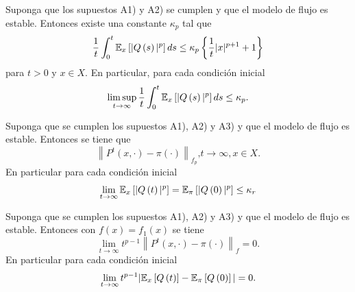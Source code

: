 \begin{Teo}\label{Tma.5.5.DaiSean}
Suponga que los supuestos A1) y A2) se cumplen y que el modelo de
flujo es estable. Entonces existe una constante $\kappa_{p}$ tal
que
\begin{equation}
\frac{1}{t}\int_{0}^{t}\mathbb{E}_{x}\left[|Q\left(s\right)|^{p}\right]ds\leq\kappa_{p}\left\{\frac{1}{t}|x|^{p+1}+1\right\}
\end{equation}
para $t>0$ y $x\in X$. En particular, para cada condici\'on
inicial
\begin{eqnarray*}
\limsup_{t\rightarrow\infty}\frac{1}{t}\int_{0}^{t}\mathbb{E}_{x}\left[|Q\left(s\right)|^{p}\right]ds\leq\kappa_{p}.
\end{eqnarray*}
\end{Teo}

\begin{Teo}\label{Tma.6.2.DaiSean}
Suponga que se cumplen los supuestos A1), A2) y A3) y que el
modelo de flujo es estable. Entonces se tiene que
\begin{equation}
\left\|P^{t}\left(x,\cdot\right)-\pi\left(\cdot\right)\right\|_{f_{p}}\textrm{,
}t\rightarrow\infty,x\in X.
\end{equation}
En particular para cada condici\'on inicial
\begin{eqnarray*}
\lim_{t\rightarrow\infty}\mathbb{E}_{x}\left[|Q\left(t\right)|^{p}\right]=\mathbb{E}_{\pi}\left[|Q\left(0\right)|^{p}\right]\leq\kappa_{r}
\end{eqnarray*}
\end{Teo}
\begin{Teo}\label{Tma.6.3.DaiSean}
Suponga que se cumplen los supuestos A1), A2) y A3) y que el
modelo de flujo es estable. Entonces con
$f\left(x\right)=f_{1}\left(x\right)$ se tiene
\begin{equation}
\lim_{t\rightarrow\infty}t^{p-1}\left\|P^{t}\left(x,\cdot\right)-\pi\left(\cdot\right)\right\|_{f}=0.
\end{equation}
En particular para cada condici\'on inicial
\begin{eqnarray*}
\lim_{t\rightarrow\infty}t^{p-1}|\mathbb{E}_{x}\left[Q\left(t\right)\right]-\mathbb{E}_{\pi}\left[Q\left(0\right)\right]|=0.
\end{eqnarray*}
\end{Teo}

